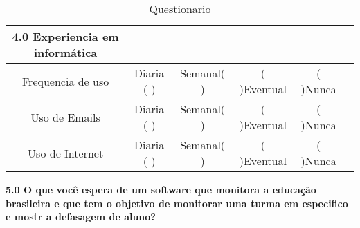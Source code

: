 \begin{table}
\centering
\begin{tabular}{|c|c|c|c|c|c|} 

\hline
	\textbf{4.0 Experiencia em informática}\\ 
\hline
   Frequencia de uso & Diaria ( ) & Semanal( ) & ( )Eventual & ( )Nunca &  \\
\hline
   Uso de Emails & Diaria ( ) & Semanal( ) & ( )Eventual & ( )Nunca &  \\
\hline
	Uso de Internet& Diaria ( ) & Semanal( ) & ( )Eventual & ( )Nunca & \\
\hline
\end{tabular}
\caption{Questionario}

\end{table}


\textbf{5.0 O que você espera de um software que monitora a educação brasileira e que tem o objetivo de monitorar uma turma em especifico e mostr a defasagem de aluno?}